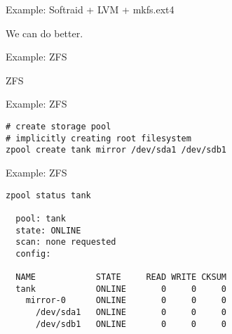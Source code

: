 
\begin{frame}{Example: Softraid + LVM + mkfs.ext4}
	\begin{center}
	\Huge
	We can do better.
	\end{center}
\end{frame}

\begin{frame}{Example: ZFS}
	\begin{center}
		\Huge ZFS
	\end{center}
\end{frame}


\begin{frame}[fragile]{Example: ZFS} 
\begin{verbatim}
# create storage pool
# implicitly creating root filesystem
zpool create tank mirror /dev/sda1 /dev/sdb1
\end{verbatim}
\end{frame}


\begin{frame}[fragile]{Example: ZFS} 
\begin{verbatim}
zpool status tank

  pool: tank
  state: ONLINE
  scan: none requested
  config:
  
  NAME            STATE     READ WRITE CKSUM
  tank            ONLINE       0     0     0
    mirror-0      ONLINE       0     0     0
      /dev/sda1   ONLINE       0     0     0
      /dev/sdb1   ONLINE       0     0     0
\end{verbatim}
\end{frame}
